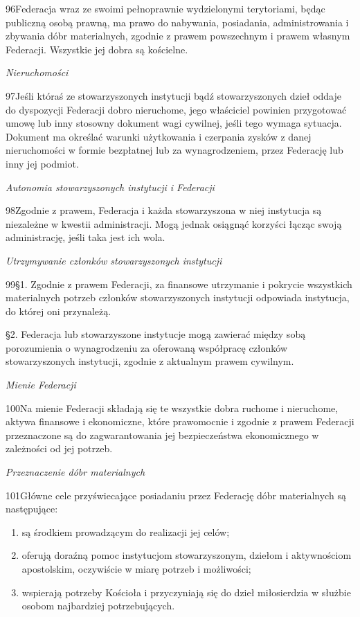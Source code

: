 ﻿\documentclass{book}
\newcommand{\lett}[1]{\lettrine[findent=6pt]{#1}}
\newcommand{\ssec}[1]{\vspace{1em}\textit{#1}\vspace{.5em}\nopagebreak}
\begin{document}
\lett{96} Federacja wraz ze swoimi pełnoprawnie wydzielonymi terytoriami, będąc publiczną osobą prawną, ma prawo do nabywania, posiadania, administrowania i zbywania dóbr materialnych, zgodnie z prawem powszechnym i prawem własnym Federacji. Wszystkie jej dobra są kościelne.
 


\ssec{Nieruchomości}


\lett{97} Jeśli któraś ze stowarzyszonych instytucji bądź stowarzyszonych dzieł oddaje do dyspozycji Federacji dobro nieruchome, jego właściciel powinien przygotować umowę lub inny stosowny dokument wagi cywilnej, jeśli tego wymaga sytuacja. Dokument ma określać warunki użytkowania i czerpania zysków z danej nieruchomości w formie bezpłatnej lub za wynagrodzeniem, przez Federację lub inny jej podmiot.
 
\ssec{Autonomia stowarzyszonych instytucji i Federacji}


\lett{98} Zgodnie z prawem, Federacja i każda stowarzyszona w niej instytucja są niezależne w kwestii administracji. Mogą jednak osiągnąć korzyści łącząc swoją administrację, jeśli taka jest ich wola.
 
\ssec{Utrzymywanie członków stowarzyszonych instytucji}


\lett{99} \S{}1. Zgodnie z prawem Federacji, za finansowe utrzymanie i pokrycie wszystkich materialnych potrzeb członków stowarzyszonych instytucji odpowiada instytucja, do której oni przynależą.


\S{}2. Federacja lub stowarzyszone instytucje mogą zawierać między sobą porozumienia o wynagrodzeniu za oferowaną współpracę członków stowarzyszonych instytucji, zgodnie z aktualnym prawem cywilnym.




\ssec{Mienie Federacji}


\lett{100} Na mienie Federacji składają się te wszystkie dobra ruchome i nieruchome, aktywa finansowe i ekonomiczne, które prawomocnie i zgodnie z prawem Federacji przeznaczone są do zagwarantowania jej bezpieczeństwa ekonomicznego w zależności od jej potrzeb.
 
\ssec{Przeznaczenie dóbr materialnych}


\lett{101} Główne cele przyświecające posiadaniu przez Federację dóbr materialnych są następujące:


\begin{enumerate}


\item są środkiem prowadzącym do realizacji jej celów;


\item oferują doraźną pomoc instytucjom stowarzyszonym, dziełom i aktywnościom apostolskim, oczywiście w miarę potrzeb i możliwości;


\item wspierają potrzeby Kościoła i przyczyniają się do dzieł miłosierdzia w służbie osobom najbardziej potrzebujących.


\end{enumerate}
 
\end{document}
